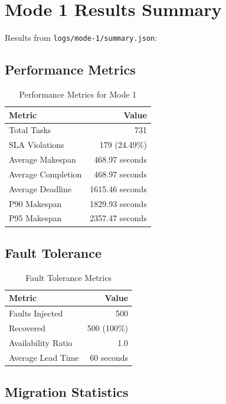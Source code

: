 \documentclass[12pt,a4paper]{article}
\begin{document}
\section{Mode 1 Results Summary}

Results from \texttt{logs/mode-1/summary.json}:

\subsection{Performance Metrics}

\begin{table}[h]
\centering
\begin{tabular}{@{}lr@{}}
\toprule
\textbf{Metric} & \textbf{Value} \\ \midrule
Total Tasks & 731 \\
SLA Violations & 179 (24.49\%) \\
Average Makespan & 468.97 seconds \\
Average Completion & 468.97 seconds \\
Average Deadline & 1615.46 seconds \\
P90 Makespan & 1829.93 seconds \\
P95 Makespan & 2357.47 seconds \\ \bottomrule
\end{tabular}
\caption{Performance Metrics for Mode 1}
\end{table}

\subsection{Fault Tolerance}

\begin{table}[h]
\centering
\begin{tabular}{@{}lr@{}}
\toprule
\textbf{Metric} & \textbf{Value} \\ \midrule
Faults Injected & 500 \\
Recovered & 500 (100\%) \\
Availability Ratio & 1.0 \\
Average Lead Time & 60 seconds \\ \bottomrule
\end{tabular}
\caption{Fault Tolerance Metrics}
\end{table}

\subsection{Migration Statistics}
\end{document}

